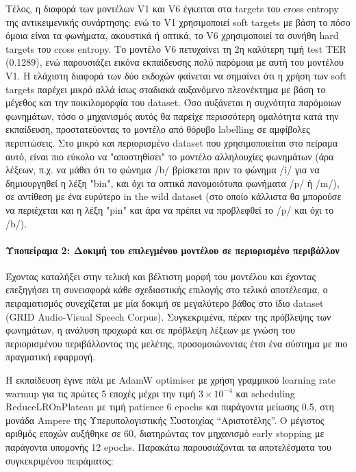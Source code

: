 Τέλος, η διαφορά των μοντέλων V1 και V6 έγκειται στα targets του cross entropy της αντικειμενικής συνάρτησης: ενώ το V1 χρησιμοποιεί soft targets με βάση το πόσο όμοια είναι τα φωνήματα, ακουστικά ή οπτικά, το V6 χρησιμοποιεί τα συνήθη hard targets του cross entropy. Το μοντέλο V6 πετυχαίνει τη 2η καλύτερη τιμή test TER (0.1289), ενώ παρουσιάζει εικόνα εκπαίδευσης πολύ παρόμοια με αυτή του μοντέλου V1. Η ελάχιστη διαφορά των δύο εκδοχών φαίνεται να σημαίνει ότι η χρήση των soft targets παρέχει μικρό αλλά ίσως σταδιακά αυξανόμενο πλεονέκτημα με βάση το μέγεθος και την ποικιλομορφία του dataset. Όσο αυξάνεται η συχνότητα παρόμοιων φωνημάτων, τόσο ο μηχανισμός αυτός θα παρείχε περισσότερη ομαλότητα κατά την εκπαίδευση, προστατεύοντας το μοντέλο από θόρυβο labelling σε αμφίβολες περιπτώσεις. Στο μικρό και περιορισμένο dataset που χρησιμοποιείται στο πείραμα αυτό, είναι πιο εύκολο να "αποστηθίσει" το μοντέλο αλληλουχίες φωνημάτων (άρα λέξεων, π.χ. να μάθει ότι το φώνημα /b/ βρίσκεται πριν το φώνημα /i/ για να δημιουργηθεί η λέξη "bin", και όχι τα οπτικά πανομοιότυπα φωνήματα /p/ ή /m/), σε αντίθεση με ένα ευρύτερο in the wild dataset (στο οποίο κάλλιστα θα μπορούσε να περιέχεται και η λέξη "pin" και άρα να πρέπει να προβλεφθεί το /p/ και όχι το /b/). 

\paragraph{Υποπείραμα 2: Δοκιμή του επιλεγμένου μοντέλου σε περιορισμένο περιβάλλον}

Έχοντας καταλήξει στην τελική και βέλτιστη μορφή του μοντέλου και έχοντας επεξηγήσει τη συνεισφορά κάθε σχεδιαστικής επιλογής στο τελικό αποτέλεσμα, ο πειραματισμός συνεχίζεται με μία δοκιμή σε μεγαλύτερο βάθος στο ίδιο dataset (GRID Audio-Visual Speech Corpus). Συγκεκριμένα, πέραν της πρόβλεψης των φωνημάτων, η ανάλυση προχωρά και σε πρόβλεψη λέξεων με γνώση του περιορισμένου περιβάλλοντος της μελέτης, προσομοιώνοντας έτσι ένα σύστημα με πιο πραγματική εφαρμογή.

Η εκπαίδευση έγινε πάλι με AdamW optimiser με χρήση γραμμικού learning rate warmup για τις πρώτες 5 εποχές μέχρι την τιμή $3\times10^{-4}$ και scheduling ReduceLROnPlateau με τιμή patience 6 epochs και παράγοντα μείωσης 0.5, στη μονάδα Ampere της Υπερυπολογιστικής Συστοιχίας ``Αριστοτέλης''. Ο μέγιστος αριθμός εποχών αυξήθηκε σε 60, διατηρώντας τον μηχανισμό early stopping με παράγοντα υπομονής 12 epochs. Παρακάτω παρουσιάζονται τα αποτελέσματα του συγκεκριμένου πειράματος:

